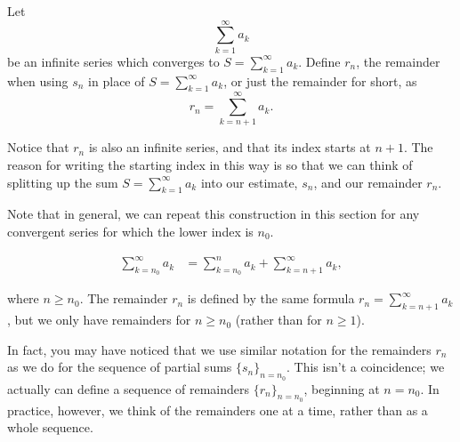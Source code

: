 \documentclass{ximera}
\begin{document}
\begin{definition}
Let
\[
 \sum \limits_{k=1}^\infty a_k
\]
be an infinite series which converges to $S = \sum \limits_{k=1}^\infty a_k$.  Define $r_n$, the remainder when using $s_n$ in place of $S = \sum \limits_{k=1}^\infty a_k$, or just the remainder for short, as
\[
r_n = \sum \limits_{k=n+1}^{\infty} a_k.
\]
\end{definition}

Notice that $r_n$ is also an infinite series, and that its index starts at $n+1$.  The reason for writing the starting index in this way is so that we can think of splitting up the sum $S = \sum \limits_{k=1}^\infty a_k$ into our estimate, $s_n$, and our remainder $r_n$.

\begin{image}
  \end{image} %

\begin{remark}
Note that in general, we can repeat this construction in this section for any convergent series for which the lower index is $n_0$.

\begin{align*}
\sum_{k=n_0}^\infty a_k &= \sum_{k=n_0}^n a_k+\sum_{k=n+1}^\infty a_k,
\end{align*}

where $n \geq n_0$.  The remainder $r_n$ is defined by the same formula $r_n = \sum_{k=n+1}^{\infty} a_k$, but we only have remainders for $n \geq n_0$ (rather than for $n \geq 1$).  

In fact, you may have noticed that we use similar notation for the remainders $r_n$ as we do for the sequence of partial sums $\{s_n\}_{n = n_0}$.  This isn't a coincidence; we actually can define a sequence of remainders $\{r_n\}_{n=n_0}$, beginning at $n=n_0$.  In practice, however, we think of the remainders one at a time, rather than as a whole sequence. 
\end{remark}
\end{document}
